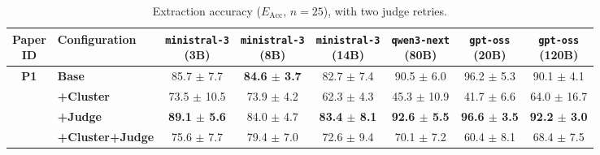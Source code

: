 \begin{table}[htbp]
    \centering
    \small
    \setlength{\tabcolsep}{4pt}
    \caption{Extraction accuracy ($E_{\text{Acc}}$, $n=25$), with two judge retries.}
    \begin{tabular}{c|l|cccccc}
        \toprule
        \makecell{\textbf{Paper} \\ \textbf{ID}} & \textbf{Configuration}& \makecell{\texttt{ministral-3} \\ (3B)} & \makecell{\texttt{ministral-3} \\ (8B)} & \makecell{\texttt{ministral-3} \\ (14B)} & \makecell{\texttt{qwen3-next} \\ (80B)} & \makecell{\texttt{gpt-oss} \\ (20B)} & \makecell{\texttt{gpt-oss} \\ (120B)} \\
        \hline
        
        \multirow{4}{*}{\textbf{P1}} 
          & \textbf{Base}& 85.7 $\pm$ 7.7 & \textbf{84.6 $\pm$ 3.7} & 82.7 $\pm$ 7.4 & 90.5 $\pm$ 6.0 & 96.2 $\pm$ 5.3 & 90.1 $\pm$ 4.1 \\
          & \textbf{+Cluster}& 73.5 $\pm$ 10.5 & 73.9 $\pm$ 4.2 & 62.3 $\pm$ 4.3 & 45.3 $\pm$ 10.9 & 41.7 $\pm$ 6.6 & 64.0 $\pm$ 16.7 \\
          & \textbf{+Judge}& \textbf{89.1 $\pm$ 5.6} & 84.0 $\pm$ 4.7 & \textbf{83.4 $\pm$ 8.1} & \textbf{92.6 $\pm$ 5.5} & \textbf{96.6 $\pm$ 3.5} & \textbf{92.2 $\pm$ 3.0} \\
          & \textbf{+Cluster+Judge}& 75.6 $\pm$ 7.7 & 79.4 $\pm$ 7.0 & 72.6 $\pm$ 9.4 & 70.1 $\pm$ 7.2 & 60.4 $\pm$ 8.1 & 68.4 $\pm$ 7.5 \\
        \hline
        
        \bottomrule
    \end{tabular}
    \label{tab:results_p1}
\end{table}